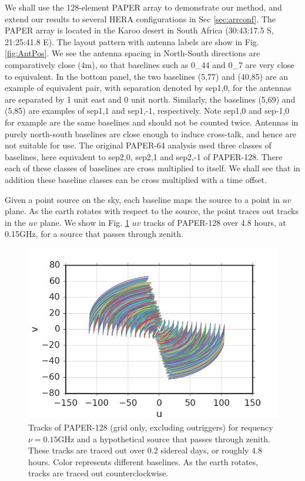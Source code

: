 \documentclass[twocolumn,apj,numberedappendix]{emulateapj}
\renewcommand\[{\begin{equation}}
\renewcommand\]{\end{equation}}
\begin{document}
We shall use the 128-element PAPER array to demonstrate our method, and extend our results to several HERA configurations in Sec \ref{sec:arrconf}. 
The PAPER array is located in the Karoo desert in South Africa (30:43:17.5
S, 21:25:41.8 E). The layout pattern with antenna labels are show
in Fig. \ref{fig:AntPos}. We see the antenna spacing in North-South
directions are comparatively close (4m), so that baselines such as
0\_44 and 0\_7 are very close to equivalent. In the bottom panel, the two baselines (5,77) and (40,85) are an example of equivalent pair, with separation denoted by sep1,0, for the
antennas are separated by 1 unit east and 0 unit north. Similarly,
the baselines (5,69) and (5,85) are examples
of sep1,1 and sep1,-1, respectively.
Note sep1,0 and sep-1,0 for example are the same baselines and should
not be counted twice. Antennas in purely north-south baselines
are close enough to induce cross-talk, and hence are not suitable
for use. The original PAPER-64 analysis \citep{Ali2015} used three classes of baselines, here
equivalent to 
sep2,0, sep2,1 and sep2,-1 \cite{Ali2015} of PAPER-128. There each of these classes
of baselines are cross multiplied to itself. We shall see that in addition these
baseline classes can be cross multiplied with a time offset.


Given a point source on the sky, each baseline maps the
source to a point in $uv$ plane. As the earth rotates with respect to
the source, the point traces out tracks in the $uv$ plane. 
We show in Fig. \ref{fig:Tracks} $uv$ tracks of PAPER-128 over 4.8 hours, at 0.15GHz, for a source that passes through zenith. 


\begin{figure}[H]
\includegraphics[width=\linewidth]{tracks128}
\caption{Tracks of PAPER-128 (grid only, excluding outriggers) for requency $\nu=0.15\text{GHz}$ and a hypothetical source that passes through zenith.
These tracks are traced out over 0.2 sidereal days, or roughly 4.8
hours. Color represents different baselines. 
As the earth rotates, tracks are traced out counterclockwise. }
\label{fig:Tracks}
\end{figure}
\end{document}
